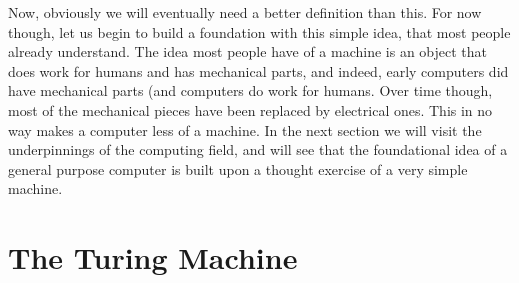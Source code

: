 \documentclass[11pt,fleqn]{book} %
\begin{document}
Now, obviously we will eventually need a better definition than this.  For now though, let us begin to build a foundation with this simple idea, that most people already understand.  The idea most people have of a machine is an object that does work for humans and has mechanical parts, and indeed, early computers did have mechanical parts (and computers do work for humans.  Over time though, most of the mechanical pieces have been replaced by electrical ones.  This in no way makes a computer less of a machine.  In the next section we will visit the underpinnings of the computing field, and will see that the foundational idea of a general purpose computer is built upon a thought exercise of a very simple machine.

\section{The Turing Machine}
\end{document}
